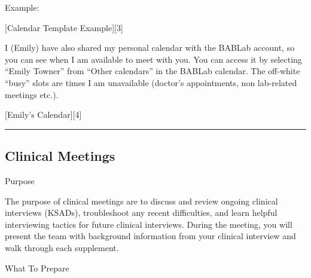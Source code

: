 \documentclass[]{book}
\begin{document}
Example:

{[}Calendar Template Example{]}{[}3{]}

I (Emily) have also shared my personal calendar with the BABLab account, so you can see when I am available to meet with you. You can access it by selecting ``Emily Towner'' from ``Other calendars'' in the BABLab calendar. The off-white ``busy'' slots are times I am unavailable (doctor's appointments, non lab-related meetings etc.).

{[}Emily's Calendar{]}{[}4{]}

\begin{center}\rule{0.5\linewidth}{\linethickness}\end{center}

\hypertarget{clinical-meetings}{%
\subsection{Clinical Meetings}\label{clinical-meetings}}

Purpose

The purpose of clinical meetings are to discuss and review ongoing clinical interviews (KSADs), troubleshoot any recent difficulties, and learn helpful interviewing tactics for future clinical interviews. During the meeting, you will present the team with background information from your clinical interview and walk through each supplement.

What To Prepare
\end{document}
